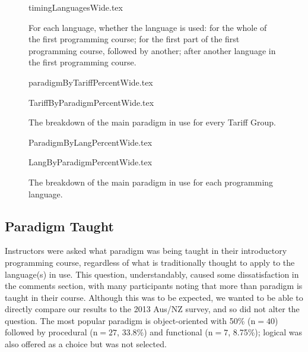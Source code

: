 \documentclass[a4paper,11pt]{article}
\begin{document}
\begin{figure}[ht]
\begin{center}
{timingLanguagesWide.tex}
\end{center}
\caption{For each language, whether the language is used: for the whole of the first programming course; for the first part of the first programming course, followed by another; after another language in the first programming course.
\label{fig:timing}}
\end{figure}




\begin{figure}[ht]
\begin{center}
{paradigmByTariffPercentWide.tex}
\end{center}
\begin{center}
{TariffByParadigmPercentWide.tex}
\end{center}
\caption{The breakdown of the main paradigm in use for every Tariff Group.\label{fig:paradigmTariff}}
\end{figure}

\begin{figure}[ht]
\begin{center}
{ParadigmByLangPercentWide.tex}
\end{center}
\begin{center}
{LangByParadigmPercentWide.tex}
\end{center}
\caption{The breakdown of the main paradigm in use for each programming language.\label{fig:paradigmLang}}
\end{figure}
\subsection{Paradigm Taught}

Instructors were asked what paradigm was being taught in their
introductory programming course, regardless of what is traditionally
thought to apply to the language(s) in use. This question,
understandably, caused some dissatisfaction in the comments section,
with many participants noting that more than paradigm is taught in
their course. Although this was to be expected, we wanted to be able
to directly compare our results to the 2013 Aus/NZ survey, and so did
not alter the question. The most popular paradigm is object-oriented
with 50\% ($\mathrm{n}=40$) followed by procedural ($\mathrm{n}=27$, 33.8\%) and functional
($\mathrm{n}=7$, 8.75\%); logical was also offered as a choice but was not
selected.
\end{document}
